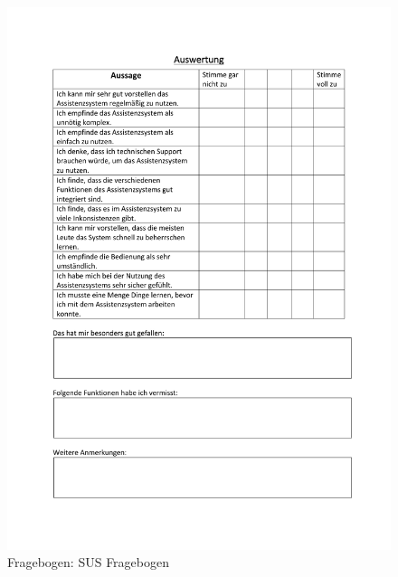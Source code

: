\begin{figure}[h!]
\centering
\includegraphics[scale=0.71]{DA_files/Bilder/Anhang/Fragebogen-Auswertung-1.pdf}
\caption{Fragebogen: SUS Fragebogen}
\end{figure}

